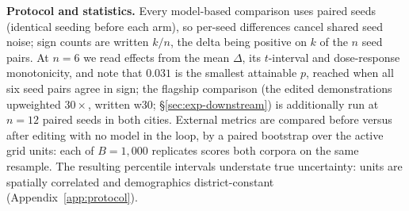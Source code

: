 \textbf{Protocol and statistics.} Every model-based comparison uses paired
seeds (identical seeding before each arm), so per-seed differences cancel
shared seed noise; sign counts are written $k/n$, the delta being positive on
$k$ of the $n$ seed pairs. At $n = 6$ we read effects from the mean $\Delta$,
its $t$-interval and dose-response monotonicity, and note that $0.031$ is the smallest
attainable $p$, reached when all six seed pairs agree in sign; the flagship comparison (the edited
demonstrations upweighted $30\times$, written w30; \S\ref{sec:exp-downstream})
is additionally run at $n = 12$ paired seeds in both cities. External metrics
are compared before versus after editing with no model in the loop, by a
paired bootstrap over the active grid units: each of $B = 1{,}000$ replicates
scores both corpora on the same resample. The resulting percentile intervals
understate true uncertainty: units are spatially correlated and demographics
district-constant (Appendix~\ref{app:protocol}).

